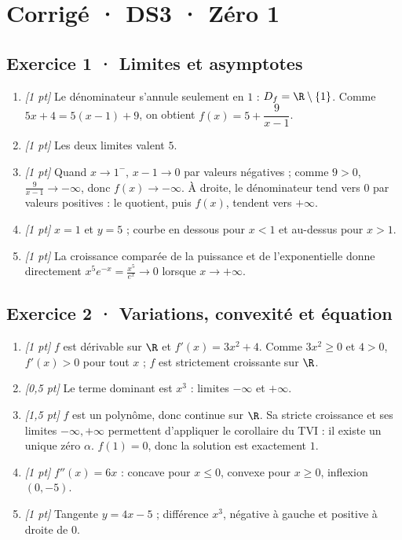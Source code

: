 \ifprof\clearpage

\section*{Corrigé · DS3 · Zéro 1}\label{cor:4-1}

\subsection*{Exercice 1 · Limites et asymptotes}\begin{enumerate}

\item \textit{[1 pt]} Le dénominateur s'annule seulement en $1$ : $D_f=\R\setminus\{1\}$. Comme $5x+4=5(x-1)+9$, on obtient $f(x)=5+\dfrac{9}{x-1}$.

\item \textit{[1 pt]} Les deux limites valent $5$.

\item \textit{[1 pt]} Quand $x\to 1^-$, $x-1\to0$ par valeurs négatives ; comme $9>0$, $\frac{9}{x-1}\to-\infty$, donc $f(x)\to-\infty$. À droite, le dénominateur tend vers $0$ par valeurs positives : le quotient, puis $f(x)$, tendent vers $+\infty$.

\item \textit{[1 pt]} $x=1$ et $y=5$ ; courbe en dessous pour $x<1$ et au-dessus pour $x>1$.

\item \textit{[1 pt]} La croissance comparée de la puissance et de l'exponentielle donne directement $x^5e^{-x}=\frac{x^5}{e^x}\to0$ lorsque $x\to+\infty$.

\end{enumerate}

\subsection*{Exercice 2 · Variations, convexité et équation}\begin{enumerate}

\item \textit{[1 pt]} $f$ est dérivable sur $\R$ et $f'(x)=3x^2+4$. Comme $3x^2\ge0$ et $4>0$, $f'(x)>0$ pour tout $x$ ; $f$ est strictement croissante sur $\R$.

\item \textit{[0,5 pt]} Le terme dominant est $x^3$ : limites $-\infty$ et $+\infty$.

\item \textit{[1,5 pt]} $f$ est un polynôme, donc continue sur $\R$. Sa stricte croissance et ses limites $-\infty,+\infty$ permettent d'appliquer le corollaire du TVI : il existe un unique zéro $\alpha$. $f(1)=0$, donc la solution est exactement $1$.

\item \textit{[1 pt]} $f''(x)=6x$ : concave pour $x\le0$, convexe pour $x\ge0$, inflexion $(0,-5)$.

\item \textit{[1 pt]} Tangente $y=4x-5$ ; différence $x^3$, négative à gauche et positive à droite de $0$.

\end{enumerate}

